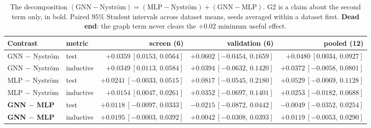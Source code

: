 \documentclass[10pt]{article}
\begin{document}
\begin{table}[h]\centering\footnotesize
\caption{The decomposition $(\text{GNN}-\text{Nystr\"om}) = (\text{MLP}-\text{Nystr\"om}) +
(\text{GNN}-\text{MLP})$. G2 is a claim about the second term only, in bold. Paired $95\%$
Student intervals across dataset means, seeds averaged within a dataset first.
\textbf{Dead end}: the graph term never clears the $+0.02$ minimum useful effect.}
\begin{tabular}{@{}l l r r r@{}}
\toprule
Contrast & metric & screen (6) & validation (6) & pooled (12)\\
\midrule
GNN $-$ Nystr\"om & test      & $+0.0359\ [0.0153,\, 0.0564]$ & $+0.0602\ [-0.0454,\, 0.1659]$ & $+0.0480\ [0.0034,\, 0.0927]$\\
GNN $-$ Nystr\"om & inductive & $+0.0349\ [0.0113,\, 0.0584]$ & $+0.0394\ [-0.0632,\, 0.1420]$ & $+0.0372\ [-0.0058,\, 0.0801]$\\
MLP $-$ Nystr\"om & test      & $+0.0241\ [-0.0033,\, 0.0515]$ & $+0.0817\ [-0.0545,\, 0.2180]$ & $+0.0529\ [-0.0069,\, 0.1128]$\\
MLP $-$ Nystr\"om & inductive & $+0.0154\ [0.0047,\, 0.0261]$ & $+0.0352\ [-0.0697,\, 0.1401]$ & $+0.0253\ [-0.0182,\, 0.0688]$\\
\midrule
\textbf{GNN $-$ MLP} & test      & $+0.0118\ [-0.0097,\, 0.0333]$ & $-0.0215\ [-0.0872,\, 0.0442]$ & $\mathbf{-0.0049\ [-0.0352,\, 0.0254]}$\\
\textbf{GNN $-$ MLP} & inductive & $+0.0195\ [-0.0003,\, 0.0392]$ & $+0.0042\ [-0.0308,\, 0.0393]$ & $\mathbf{+0.0119\ [-0.0053,\, 0.0290]}$\\
\bottomrule
\end{tabular}
\end{table}
\end{document}
